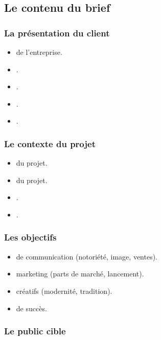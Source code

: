 \subsection{Le contenu du brief}

\subsubsection{La présentation du client}

\begin{itemize}
    \item {} de l'entreprise.
    \item {}.
    \item {}.
    \item {}.
    \item {}.
\end{itemize}

\subsubsection{Le contexte du projet}

\begin{itemize}
    \item {} du projet.
    \item {} du projet.
    \item {}.
    \item {}.
\end{itemize}

\subsubsection{Les objectifs}

\begin{itemize}
    \item {} de communication (notoriété, image, ventes).
    \item {} marketing (parts de marché, lancement).
    \item {} créatifs (modernité, tradition).
    \item {} de succès.
\end{itemize}

\subsubsection{Le public cible}

